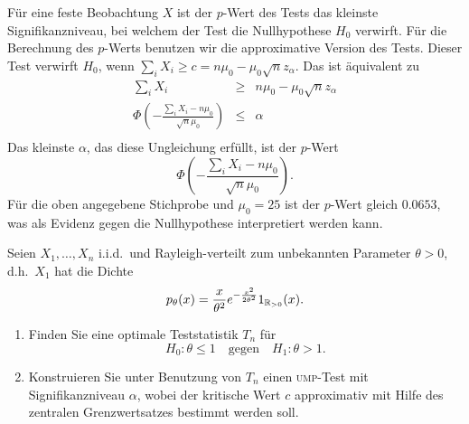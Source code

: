 Für eine feste Beobachtung $X$ ist der $p$-Wert des Tests das kleinste Signifikanzniveau, 
bei welchem der Test die Nullhypothese $H_0$ verwirft. Für die Berechnung des $p$-Werts
benutzen wir die approximative Version des Tests. Dieser Test verwirft $H_0$, wenn
$\sum_{i}^{} X_i \geq c = n \mu_0 - \mu_0 \sqrt{n} z_\alpha$. Das ist äquivalent zu
\begin{eqnarray*}
    \sum_{i}^{} X_i &\geq & n \mu_0 - \mu_0 \sqrt{n} z_\alpha \\ 
    \Phi \left(  - \frac{ \sum_{i}^{} X_i -n \mu_0   }{\sqrt{n} \mu_0} \right) &\leq& \alpha \\
\end{eqnarray*}
Das kleinste $\alpha$, das diese Ungleichung erfüllt, ist der $p$-Wert
\begin{equation*}
    \Phi \left(  - \frac{ \sum_{i}^{} X_i -n \mu_0   }{\sqrt{n} \mu_0} \right).
\end{equation*}
Für die oben angegebene Stichprobe und $\mu_0=25$ ist der $p$-Wert gleich $0.0653$, was als
Evidenz gegen die Nullhypothese interpretiert werden kann.








 Seien $X_1,\ldots,X_n$ i.i.d.\ und Rayleigh-verteilt
zum unbekannten Parameter $\theta>0$, d.h.\ $X_1$ hat die Dichte 
\begin{equation*}
    p_\theta(x) = \frac{x}{\theta^2} e^{- \frac{x^2}{2\theta^2}} 1_{\mathbb R_{>0}}(x).
\end{equation*}
\begin{enumerate}
    \item Finden Sie eine optimale Teststatistik $T_n$ für
        \begin{equation*}
            H_0 : \theta\leq 1 \quad \textrm{gegen} \quad H_1 : \theta >1.
        \end{equation*}
    \item Konstruieren Sie unter Benutzung von $T_n$ einen \textsc{ump}-Test mit Signifikanzniveau 
        $\alpha$, wobei der kritische Wert $c$ approximativ mit Hilfe des zentralen Grenzwertsatzes
        bestimmt werden soll.
\end{enumerate}

